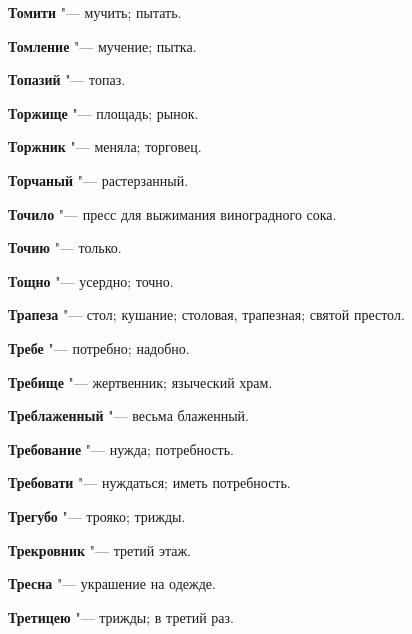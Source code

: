 \begin{mymulticols}{2}
\noindent\textbf{Томити} "--- мучить; пытать. 




\noindent\textbf{Томление} "--- мучение; пытка. 




\noindent\textbf{Топазий} "--- топаз. 




\noindent\textbf{Торжище} "--- площадь; рынок. 




\noindent\textbf{Торжник} "--- меняла; торговец. 




\noindent\textbf{Торчаный} "--- растерзанный. 




\noindent\textbf{Точило} "--- пресс для выжимания виноградного сока. 




\noindent\textbf{Точию} "--- только. 




\noindent\textbf{Тощно} "--- усердно; точно. 




\noindent\textbf{Трапеза} "--- стол; кушание; столовая, трапезная; святой престол. 




\noindent\textbf{Требе} "--- потребно; надобно. 




\noindent\textbf{Требище} "--- жертвенник; языческий храм. 




\noindent\textbf{Треблаженный} "--- весьма блаженный. 




\noindent\textbf{Требование} "--- нужда; потребность. 




\noindent\textbf{Требовати} "--- нуждаться; иметь потребность. 




\noindent\textbf{Трегубо} "--- трояко; трижды. 




\noindent\textbf{Трекровник} "--- третий этаж. 




\noindent\textbf{Тресна} "--- украшение на одежде. 




\noindent\textbf{Третицею} "--- трижды; в третий раз. 





\end{mymulticols}
